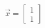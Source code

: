 \documentclass[preview]{standalone}
\begin{document}
\begin{align*}
\vec{x} =  \begin{bmatrix} 1 \\ 1 \end{bmatrix}
\end{align*}
\end{document}
